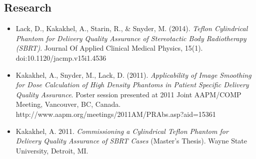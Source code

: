 \documentclass[margin]{res}
\begin{document}
\begin{resume}
\section{Research}
\begin{itemize} \itemsep -2pt %
    \item Lack, D., Kakakhel, A., Starin, R., \& Snyder, M. (2014). \textit{Teflon Cylindrical Phantom for Delivery Quality Assurance of Stereotactic Body Radiotherapy (SBRT)}. Journal Of Applied Clinical Medical Physics, 15(1). \\ doi:10.1120/jacmp.v15i1.4536
    \item Kakakhel, A., Snyder, M., Lack, D. (2011). \textit{Applicability of Image Smoothing for Dose Calculation of High Density Phantoms in Patient Specific Delivery Quality Assurance}. Poster session presented at 2011 Joint AAPM/COMP Meeting, Vancouver, BC, Canada. \\ http://www.aapm.org/meetings/2011AM/PRAbs.asp?aid=15361
    \item Kakakhel, A. 2011. \textit{Commissioning a Cylindrical Teflon Phantom for Delivery Quality Assurance of SBRT Cases} (Master's Thesis). Wayne State University, Detroit, MI.
\end{itemize}
 
 

\end{resume}
\end{document}
